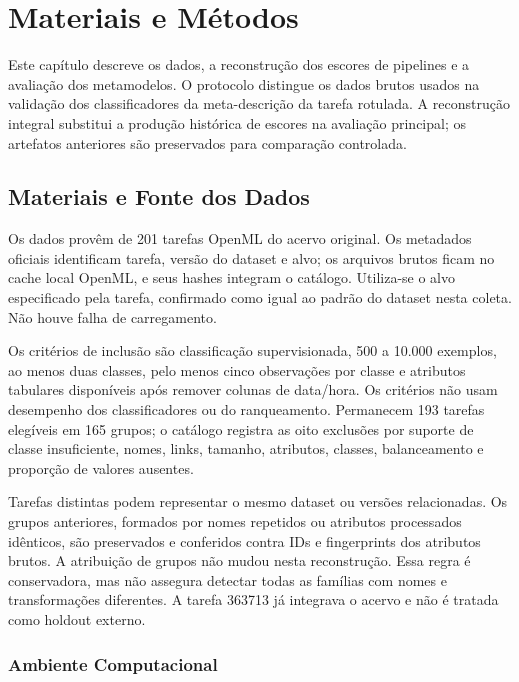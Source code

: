\chapter{Materiais e Métodos}\label{cap:materialemetodos}

Este capítulo descreve os dados, a reconstrução dos escores de pipelines e a avaliação dos metamodelos. O protocolo distingue os dados brutos usados na validação dos classificadores da meta-descrição da tarefa rotulada. A reconstrução integral substitui a produção histórica de escores na avaliação principal; os artefatos anteriores são preservados para comparação controlada.

\section{Materiais e Fonte dos Dados}\label{sec:materiais}

Os dados provêm de 201 tarefas OpenML \cite{Vanschoren2014} do acervo original. Os metadados oficiais identificam tarefa, versão do dataset e alvo; os arquivos brutos ficam no cache local OpenML, e seus hashes integram o catálogo. Utiliza-se o alvo especificado pela tarefa, confirmado como igual ao padrão do dataset nesta coleta. Não houve falha de carregamento.

Os critérios de inclusão são classificação supervisionada, 500 a 10.000 exemplos, ao menos duas classes, pelo menos cinco observações por classe e atributos tabulares disponíveis após remover colunas de data/hora. Os critérios não usam desempenho dos classificadores ou do ranqueamento. Permanecem 193 tarefas elegíveis em 165 grupos; o catálogo registra as oito exclusões por suporte de classe insuficiente, nomes, links, tamanho, atributos, classes, balanceamento e proporção de valores ausentes.

Tarefas distintas podem representar o mesmo dataset ou versões relacionadas. Os grupos anteriores, formados por nomes repetidos ou atributos processados idênticos, são preservados e conferidos contra IDs e fingerprints dos atributos brutos. A atribuição de grupos não mudou nesta reconstrução. Essa regra é conservadora, mas não assegura detectar todas as famílias com nomes e transformações diferentes. A tarefa 363713 já integrava o acervo e não é tratada como holdout externo.

\subsection{Ambiente Computacional}\label{subsec:recursos}

